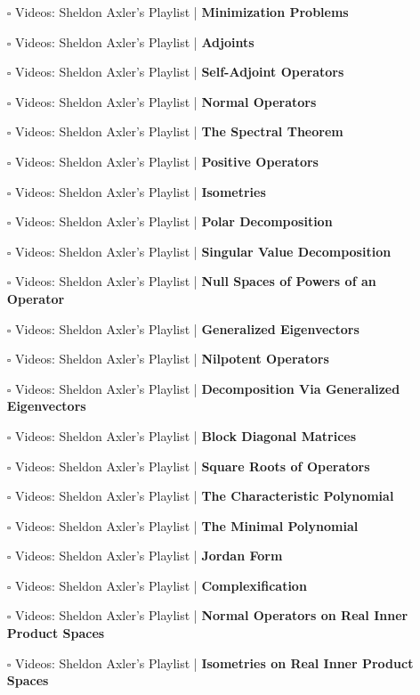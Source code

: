 \documentclass[a4, landscape, 12pt]{article}
\newcommand{\checkbox}{$\square$}%
\begin{document}
\begin{itemize}
{}
\item [\checkbox] Videos: Sheldon Axler’s Playlist  | \textbf{Minimization Problems
}
\item [\checkbox] Videos: Sheldon Axler’s Playlist  | \textbf{Adjoints
}
\item [\checkbox] Videos: Sheldon Axler’s Playlist  | \textbf{Self-Adjoint Operators
}
\item [\checkbox] Videos: Sheldon Axler’s Playlist  | \textbf{Normal Operators
}
\item [\checkbox] Videos: Sheldon Axler’s Playlist  | \textbf{The Spectral Theorem
}
\item [\checkbox] Videos: Sheldon Axler’s Playlist  | \textbf{Positive Operators
}
\item [\checkbox] Videos: Sheldon Axler’s Playlist  | \textbf{Isometries
}
\item [\checkbox] Videos: Sheldon Axler’s Playlist  | \textbf{Polar Decomposition
}
\item [\checkbox] Videos: Sheldon Axler’s Playlist  | \textbf{Singular Value Decomposition
}
\item [\checkbox] Videos: Sheldon Axler’s Playlist  | \textbf{Null Spaces of Powers of an Operator
}
\item [\checkbox] Videos: Sheldon Axler’s Playlist  | \textbf{Generalized Eigenvectors
}
\item [\checkbox] Videos: Sheldon Axler’s Playlist  | \textbf{Nilpotent Operators
}
\item [\checkbox] Videos: Sheldon Axler’s Playlist  | \textbf{Decomposition Via Generalized Eigenvectors
}
\item [\checkbox] Videos: Sheldon Axler’s Playlist  | \textbf{Block Diagonal Matrices
}
\item [\checkbox] Videos: Sheldon Axler’s Playlist  | \textbf{Square Roots of Operators
}
\item [\checkbox] Videos: Sheldon Axler’s Playlist  | \textbf{The Characteristic Polynomial
}
\item [\checkbox] Videos: Sheldon Axler’s Playlist  | \textbf{The Minimal Polynomial
}
\item [\checkbox] Videos: Sheldon Axler’s Playlist  | \textbf{Jordan Form
}
\item [\checkbox] Videos: Sheldon Axler’s Playlist  | \textbf{Complexification
}
\item [\checkbox] Videos: Sheldon Axler’s Playlist  | \textbf{Normal Operators on Real Inner Product Spaces
}
\item [\checkbox] Videos: Sheldon Axler’s Playlist  | \textbf{Isometries on Real Inner Product Spaces
}
\end{itemize}
\end{document}
